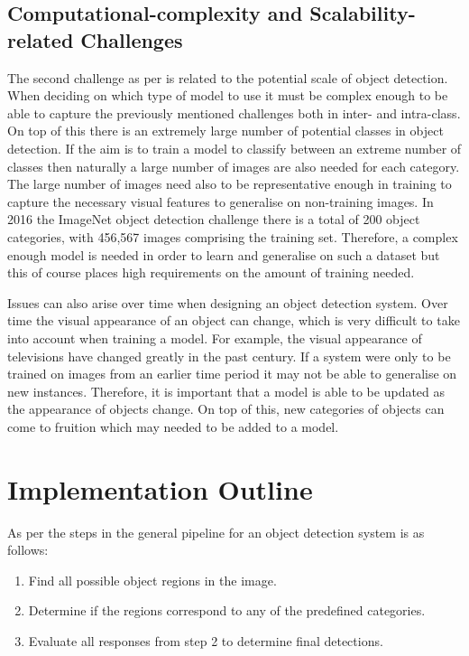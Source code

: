 \subsection{Computational-complexity and Scalability-related Challenges}
The second challenge as per \cite{zhang} is related to the potential scale of object detection. When deciding on which type of model to use it must be complex enough to be able to capture the previously mentioned challenges both in inter- and intra-class. On top of this there is an extremely large number of potential classes in object detection. If the aim is to train a model to classify between an extreme number of classes then naturally a large number of images are also needed for each category. The large number of images need also to be representative enough in training to capture the necessary visual features to generalise on non-training images. In 2016 the ImageNet object detection challenge there is a total of 200 object categories, with 456,567 images comprising the training set. Therefore, a complex enough model is needed in order to learn and generalise on such a dataset but this of course places high requirements on the amount of training needed.

Issues can also arise over time when designing an object detection system.  Over time the visual appearance of an object can change, which is very difficult to take into account when training a model. For example, the visual appearance of televisions have changed greatly in the past century. If a system were only to be trained on images from an earlier time period it may not be able to generalise on new instances. Therefore, it is important that a model is able to be updated as the appearance of objects change. On top of this, new categories of objects can come to fruition which may needed to be added to a model. 

\section{Implementation Outline}
As per \cite{zhang} the steps in the general pipeline for an object detection system is as follows:

\begin{enumerate}
	\item Find all possible object regions in the image.
	\item Determine if the regions correspond to any of the predefined categories.
	\item Evaluate all responses from step 2 to determine final detections.
\end{enumerate}


